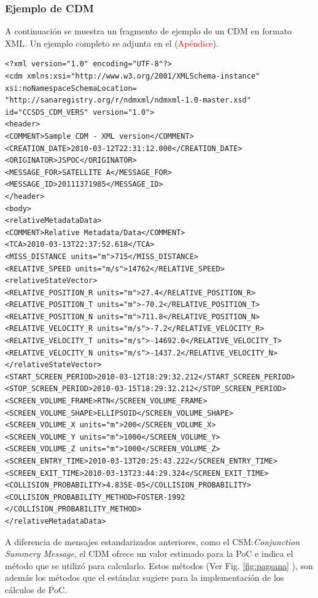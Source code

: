 {\begin{center}
\end{center}


\subsubsection*{Ejemplo de CDM}
A continuaci\'on se muestra un fragmento de ejemplo de un CDM en formato XML. Un ejemplo completo se adjunta en el (\textcolor{red}{Ap\'endice}).\\

\lstset{language=XML,basicstyle=\small}
\begin{lstlisting}
<?xml version="1.0" encoding="UTF-8"?>
<cdm xmlns:xsi="http://www.w3.org/2001/XMLSchema-instance"
xsi:noNamespaceSchemaLocation=
"http://sanaregistry.org/r/ndmxml/ndmxml-1.0-master.xsd"
id="CCSDS_CDM_VERS" version="1.0">
<header>
<COMMENT>Sample CDM - XML version</COMMENT>
<CREATION_DATE>2010-03-12T22:31:12.000</CREATION_DATE>
<ORIGINATOR>JSPOC</ORIGINATOR>
<MESSAGE_FOR>SATELLITE A</MESSAGE_FOR>
<MESSAGE_ID>20111371985</MESSAGE_ID>
</header>
<body>
<relativeMetadataData>
<COMMENT>Relative Metadata/Data</COMMENT>
<TCA>2010-03-13T22:37:52.618</TCA>
<MISS_DISTANCE units="m">715</MISS_DISTANCE>
<RELATIVE_SPEED units="m/s">14762</RELATIVE_SPEED>
<relativeStateVector>
<RELATIVE_POSITION_R units="m">27.4</RELATIVE_POSITION_R>
<RELATIVE_POSITION_T units="m">-70.2</RELATIVE_POSITION_T>
<RELATIVE_POSITION_N units="m">711.8</RELATIVE_POSITION_N>
<RELATIVE_VELOCITY_R units="m/s">-7.2</RELATIVE_VELOCITY_R>
<RELATIVE_VELOCITY_T units="m/s">-14692.0</RELATIVE_VELOCITY_T>
<RELATIVE_VELOCITY_N units="m/s">-1437.2</RELATIVE_VELOCITY_N>
</relativeStateVector>
<START_SCREEN_PERIOD>2010-03-12T18:29:32.212</START_SCREEN_PERIOD>
<STOP_SCREEN_PERIOD>2010-03-15T18:29:32.212</STOP_SCREEN_PERIOD>
<SCREEN_VOLUME_FRAME>RTN</SCREEN_VOLUME_FRAME>
<SCREEN_VOLUME_SHAPE>ELLIPSOID</SCREEN_VOLUME_SHAPE>
<SCREEN_VOLUME_X units="m">200</SCREEN_VOLUME_X>
<SCREEN_VOLUME_Y units="m">1000</SCREEN_VOLUME_Y>
<SCREEN_VOLUME_Z units="m">1000</SCREEN_VOLUME_Z>
<SCREEN_ENTRY_TIME>2010-03-13T20:25:43.222</SCREEN_ENTRY_TIME>
<SCREEN_EXIT_TIME>2010-03-13T23:44:29.324</SCREEN_EXIT_TIME>
<COLLISION_PROBABILITY>4.835E-05</COLLISION_PROBABILITY>
<COLLISION_PROBABILITY_METHOD>FOSTER-1992
</COLLISION_PROBABILITY_METHOD>
</relativeMetadataData>
\end{lstlisting}

A diferencia de mensajes estandarizados anteriores, como el CSM:{\it{Conjunction Summery Message}}, el CDM ofrece un valor estimado para la PoC e indica el m\'etodo que se utiliz\'o para calcularlo. Estos m\'etodos (Ver Fig. \ref{fig:pagsana} ), son adem\'as los m\'etodos que el est\'andar sugiere para la implementaci\'on de los c\'alculos de PoC.\\

}
